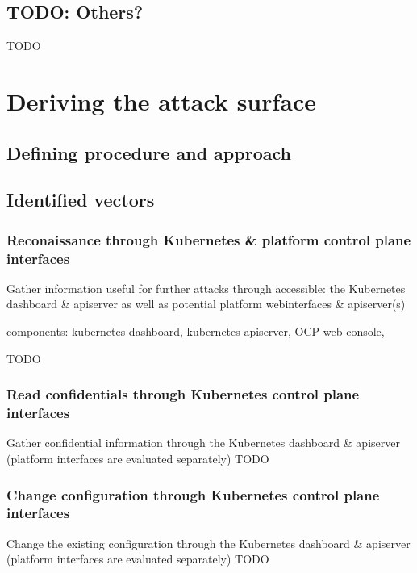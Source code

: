 \section{TODO: Others?}
TODO

\chapter{Deriving the attack surface}

\section{Defining procedure and approach}



\section{Identified vectors}

\subsection{Reconaissance through Kubernetes \& platform control plane interfaces}
Gather information useful for further attacks through accessible: the Kubernetes dashboard \& apiserver as well as potential platform webinterfaces & apiserver(s)

components: kubernetes dashboard, kubernetes apiserver, OCP web console, 


TODO

\subsection{Read confidentials through Kubernetes control plane interfaces}
Gather confidential information through the Kubernetes dashboard & apiserver (platform interfaces are evaluated separately)
TODO

\subsection{Change configuration through Kubernetes control plane interfaces}
Change the existing configuration through the Kubernetes dashboard & apiserver (platform interfaces are evaluated separately)
TODO

